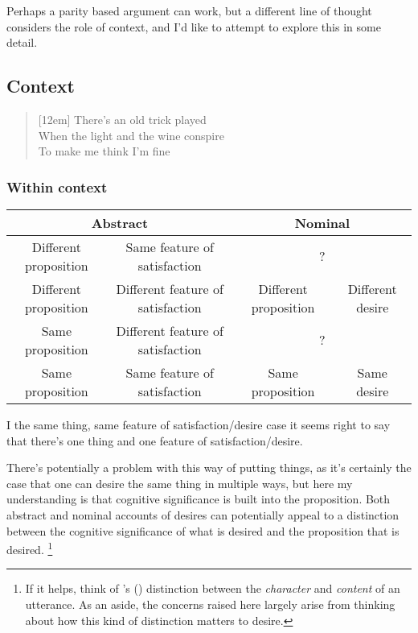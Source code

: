 \documentclass[10pt]{article}
\begin{document}
Perhaps a parity based argument can work, but a different line of thought considers the role of context, and I'd like to attempt to explore this in some detail.


\subsection{Context}
\label{sec:context}


\begin{verse}[12em]
  There's an old trick played \\
  When the light and the wine conspire \\
  To make me think I'm fine \\
\end{verse}


\subsubsection{Within context}
\label{sec:within-context}

\begin{center}
  {\setlength{\tabcolsep}{0.5em}%
      \renewcommand{\arraystretch}{1.5}%
    \begin{tabular}[h]{cc|cc}
      \multicolumn{2}{c}{Abstract} & \multicolumn{2}{c}{Nominal} \\
      \hline
      Different proposition & Same feature of satisfaction & \multicolumn{2}{c}{?} \\
      Different proposition & Different feature of satisfaction & Different proposition & Different desire \\
      Same proposition & Different feature of satisfaction & \multicolumn{2}{c}{?} \\  %
      Same proposition & Same feature of satisfaction & Same proposition & Same desire \\
    \end{tabular}
}
\end{center}

I the same thing, same feature of satisfaction/desire case it seems right to say that there's one thing and one feature of satisfaction/desire.



There's potentially a problem with this way of putting things, as it's certainly the case that one can desire the same thing in multiple ways, but here my understanding is that cognitive significance is built into the proposition.
Both abstract and nominal accounts of desires can potentially appeal to a distinction between the cognitive significance of what is desired and the proposition that is desired.\nolinebreak
\footnote{If it helps, think of \citeauthor{Kaplan:1989ab}'s (\citeyear{Kaplan:1989ab}) distinction between the \emph{character} and \emph{content} of an utterance.
As an aside, the concerns raised here largely arise from thinking about how this kind of distinction matters to desire.}
\end{document}
